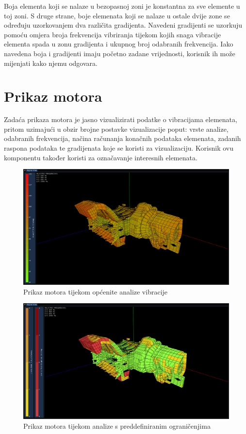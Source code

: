 \documentclass[times, utf8, diplomski]{fer}
\begin{document}
Boja elementa koji se nalaze u bezopasnoj zoni je konstantna za sve elemente u toj zoni. S druge strane, boje elemenata koji se nalaze u ostale dvije zone se određuju uzorkovanjem dva različita gradijenta. Navedeni gradijenti se uzorkuju pomoću omjera broja frekvencija vibriranja tijekom kojih snaga vibracije elementa spada u zonu gradijenta i ukupnog broj odabranih frekvencija. Iako navedena boja i gradijenti imaju početno zadane vrijednosti, korisnik ih može mijenjati kako njemu odgovara.\\


\section{Prikaz motora} \label{engine-view-section}
Zadaća prikaza motora je jasno vizualizirati podatke o vibracijama elemenata, pritom uzimajući u obzir brojne postavke vizualizacije poput: vrste analize, odabranih frekvencija, načina računanja konačnih podataka elemenata, zadanih raspona podataka te gradijenata koje se koristi za vizualizaciju. Korisnik ovu komponentu također koristi za označavanje interesnih elemenata.

\begin{figure}[H]
\centering
\includegraphics[width=\linewidth]{engine_view_normal_mode.png}
\caption{Prikaz motora tijekom općenite analize vibracije}
\label{fig:normal-mode-engine-view}
\end{figure}
\begin{figure}[h]
\centering
\includegraphics[width=\linewidth]{engine_view_limits.png}
\caption{Prikaz motora tijekom analize s preddefiniranim ograničenjima}
\label{fig:limits-mode-engine-view}
\end{figure}
\end{document}
